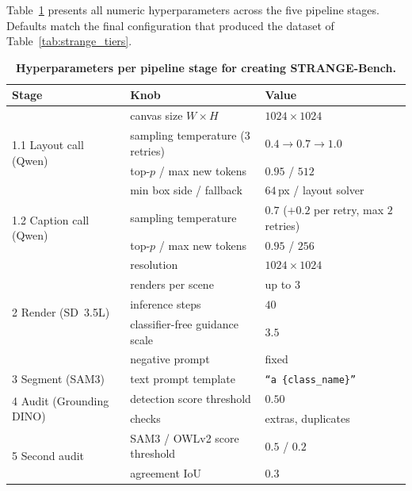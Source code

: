 Table~\ref{tab:strange_impl} presents all numeric hyperparameters across the five pipeline stages. Defaults match the final configuration that produced the dataset of Table~\ref{tab:strange_tiers}.

\begin{table}[!t]
\centering\small
\caption{\textbf{Hyperparameters per pipeline stage for creating STRANGE-Bench.}}
\label{tab:strange_impl}
\begin{tabularx}{\linewidth}{@{}ll>{\raggedright\arraybackslash}X@{}}
\toprule
Stage & Knob & Value \\
\midrule
\multirow{4}{*}{1.1 Layout call (Qwen)}
 & canvas size $W\!\times\!H$           & $1024 \times 1024$ \\
 & sampling temperature (3 retries)     & $0.4 \to 0.7 \to 1.0$ \\
 & top-$p$ / max new tokens             & $0.95$ / $512$ \\
 & min box side / fallback          & $64$\,px / layout solver \\
\midrule
\multirow{2}{*}{1.2 Caption call (Qwen)}
 & sampling temperature                 & $0.7$ ($+0.2$ per retry, max $2$ retries) \\
 & top-$p$ / max new tokens             & $0.95$ / $256$ \\
\midrule
\multirow{5}{*}{2 Render (SD~3.5L)}
 & resolution               &  $1024 \times 1024$ \\
 & renders per scene                & up to $3$ \\
 & inference steps                      & $40$ \\
 & classifier-free guidance scale       & $3.5$ \\
 & negative prompt                      & fixed \\
\midrule
\multirow{1}{*}{3 Segment (SAM3)}
 & text prompt template                 & \texttt{``a \{class\_name\}''} \\

\midrule
\multirow{2}{*}{4 Audit (Grounding DINO)}
 & detection score threshold            & $0.50$ \\
 & checks        & extras, duplicates \\
\midrule
\multirow{2}{*}{5 Second audit}
 & SAM3 / OWLv2 score threshold   & $0.5$ / $0.2$ \\
 & agreement IoU                  & $0.3$ \\
\bottomrule
\end{tabularx}
\end{table}

